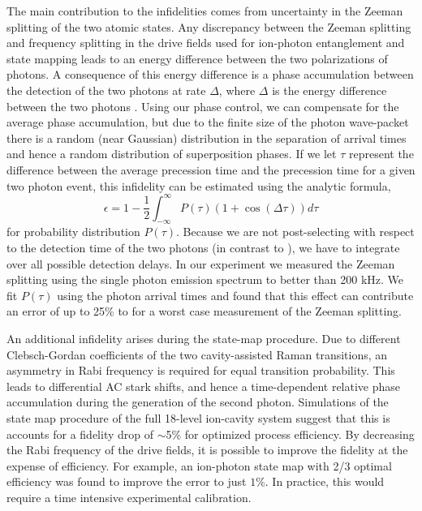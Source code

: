 \documentclass[aps,prl,twocolumn,floatfix,superscriptaddress]{revtex4-2}
\begin{document}
The main contribution to the infidelities comes from uncertainty in the Zeeman splitting of the two atomic states.
Any discrepancy between the Zeeman splitting and frequency splitting in the drive fields used for ion-photon entanglement and state mapping leads to an energy difference between the two polarizations of photons.
A consequence of this energy difference is a phase accumulation between the detection of the two photons at rate $\Delta$, where $\Delta$ is the energy difference between the two photons  \cite{doi:10.1126/science.1143835,stute2012}.
Using our phase control, we can compensate for the average phase accumulation, but due to the finite size of the photon wave-packet there is a random (near Gaussian) distribution in the separation of arrival times and hence a random distribution of superposition phases.
If we let $\tau$ represent the difference between the average precession time and the precession time for a given two photon event, this infidelity can be estimated using the analytic formula,
\begin{equation}
    \epsilon = 1-\frac{1}{2}\int^\infty_{-\infty} P(\tau)\left(1+\cos(\Delta \tau)\right) d\tau
\end{equation}
for probability distribution $P(\tau)$.
Because we are not post-selecting with respect to the detection time of the two photons (in contrast to \cite{doi:10.1126/science.1143835}), we have to integrate over all possible detection delays. In our experiment we measured the Zeeman splitting using the single photon emission spectrum to better than 200 kHz.
We fit $P(\tau)$ using the photon arrival times and found that this effect can contribute an error of up to 25\% to for a worst case measurement of the Zeeman splitting.


An additional infidelity arises during the state-map procedure. Due to different Clebsch-Gordan coefficients of the two cavity-assisted Raman transitions, an asymmetry in Rabi frequency is required for equal transition probability. This leads to differential AC stark shifts, and hence a time-dependent relative phase accumulation during the generation of the second photon. Simulations of the state map procedure of the full 18-level ion-cavity system suggest that this is accounts for a fidelity drop of $\sim$5\% for optimized process efficiency.
By decreasing the Rabi frequency of the drive fields, it is possible to improve the fidelity at the expense of efficiency.
For example, an ion-photon state map with 2/3 optimal efficiency was found to improve the error to just $1\%$.
In practice, this would require a time intensive experimental calibration.
\end{document}
